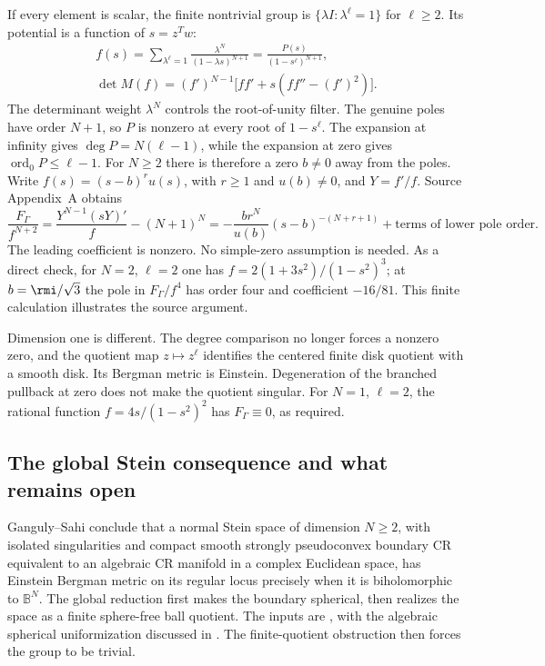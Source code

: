 If every element is scalar, the finite nontrivial group is
$\{\lambda I:\lambda^\ell=1\}$ for $\ell\geq2$.
Its potential is a function of $s=z^Tw$:
\begin{equation*}
 \begin{gathered}
 f(s)=\sum_{\lambda^\ell=1}\frac{\lambda^N}{(1-\lambda s)^{N+1}}
       =\frac{P(s)}{(1-s^\ell)^{N+1}},\\
 \det M(f)=(f')^{N-1}\bigl[ff'+s(ff''-(f')^2)\bigr].
 \end{gathered}
 \tag{H.46}\label{eq:appH-ball-quotient-scalar}
\end{equation*}
The determinant weight $\lambda^N$ controls the root-of-unity
filter. The genuine poles have order $N+1$, so $P$ is nonzero
at every root of $1-s^\ell$. The expansion at infinity gives
$\deg P=N(\ell-1)$, while the expansion at zero gives
$\operatorname{ord}_0P\leq\ell-1$. For $N\geq2$ there is
therefore a zero $b\ne0$ away from the poles. Write
$f(s)=(s-b)^r u(s)$, with $r\geq1$ and $u(b)\ne0$, and
$Y=f'/f$. Source Appendix~A obtains
\begin{equation*}
 \frac{F_\Gamma}{f^{N+2}}
  =\frac{Y^{N-1}(sY)'}{f}-(N+1)^N
  =-\frac{b r^N}{u(b)}(s-b)^{-(N+r+1)}
         +\text{terms of lower pole order}.
 \tag{H.47}\label{eq:appH-ball-quotient-scalar-pole}
\end{equation*}
The leading coefficient is nonzero. No simple-zero assumption
is needed. As a direct check, for $N=2$, $\ell=2$ one has
$f=2(1+3s^2)/(1-s^2)^3$; at $b=\rmi/\sqrt3$ the pole
in $F_\Gamma/f^4$ has order four and coefficient $-16/81$.
This finite calculation illustrates the source argument.

Dimension one is different. The degree comparison no longer
forces a nonzero zero, and the quotient map $z\mapsto z^\ell$
identifies the centered finite disk quotient with a smooth disk.
Its Bergman metric is Einstein. Degeneration of the branched
pullback at zero does not make the quotient singular.
For $N=1$, $\ell=2$, the rational function
$f=4s/(1-s^2)^2$ has $F_\Gamma\equiv0$, as required.

\subsection{The global Stein consequence and what remains open}
\label{sec:appH-ball-quotient-Stein}

Ganguly--Sahi \cite[Theorem~1.2]{GangulySahi26BallQuotientsV1}
conclude that a normal Stein space of dimension $N\geq2$,
with isolated singularities and compact smooth strongly
pseudoconvex boundary CR equivalent to an algebraic CR manifold
in a complex Euclidean space, has Einstein Bergman metric
on its regular locus precisely when it is biholomorphic to
$\mathbb B^N$. The global reduction first makes the boundary
spherical, then realizes the space as a finite sphere-free
ball quotient. The inputs are
\cite[Theorem~1.1 and Corollary~4.2]{HuangLiBergmanSteinAuthorCopy},
with the algebraic spherical uniformization discussed in
\cite[Theorem~3.1 and Corollary~3.3]{Huang06CRLinksAuthorCopy}.
The finite-quotient obstruction then forces the group to be trivial.

